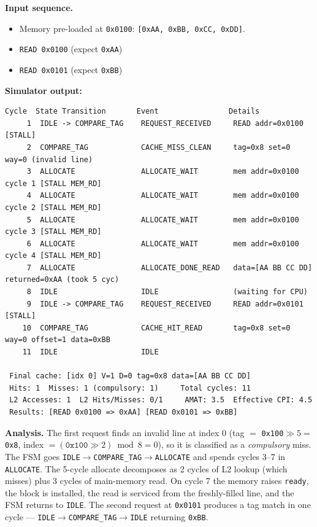 \documentclass[11pt,a4paper]{article}
\begin{document}
\textbf{Input sequence.}

\begin{itemize}[leftmargin=1.4em,itemsep=0.05em]
    \item Memory pre-loaded at \texttt{0x0100}: \texttt{[0xAA, 0xBB, 0xCC, 0xDD]}.
    \item \texttt{READ 0x0100} (expect \texttt{0xAA})
    \item \texttt{READ 0x0101} (expect \texttt{0xBB})
\end{itemize}

\textbf{Simulator output:}
\begin{lstlisting}[style=trace]
 Cycle  State Transition       Event                Details
     1  IDLE -> COMPARE_TAG    REQUEST_RECEIVED     READ addr=0x0100 [STALL]
     2  COMPARE_TAG            CACHE_MISS_CLEAN     tag=0x8 set=0 way=0 (invalid line)
     3  ALLOCATE               ALLOCATE_WAIT        mem addr=0x0100 cycle 1 [STALL MEM_RD]
     4  ALLOCATE               ALLOCATE_WAIT        mem addr=0x0100 cycle 2 [STALL MEM_RD]
     5  ALLOCATE               ALLOCATE_WAIT        mem addr=0x0100 cycle 3 [STALL MEM_RD]
     6  ALLOCATE               ALLOCATE_WAIT        mem addr=0x0100 cycle 4 [STALL MEM_RD]
     7  ALLOCATE               ALLOCATE_DONE_READ   data=[AA BB CC DD] returned=0xAA (took 5 cyc)
     8  IDLE                   IDLE                 (waiting for CPU)
     9  IDLE -> COMPARE_TAG    REQUEST_RECEIVED     READ addr=0x0101 [STALL]
    10  COMPARE_TAG            CACHE_HIT_READ       tag=0x8 set=0 way=0 offset=1 data=0xBB
    11  IDLE                   IDLE

 Final cache: [idx 0] V=1 D=0 tag=0x8 data=[AA BB CC DD]
 Hits: 1  Misses: 1 (compulsory: 1)     Total cycles: 11
 L2 Accesses: 1  L2 Hits/Misses: 0/1     AMAT: 3.5  Effective CPI: 4.5
 Results: [READ 0x0100 => 0xAA] [READ 0x0101 => 0xBB]
\end{lstlisting}

\textbf{Analysis.} The first request finds an invalid line at index 0
(tag $=$ \texttt{0x100}$\gg 5 =$ \texttt{0x8},
index $= (\texttt{0x100}\gg 2)\bmod 8 = 0$), so it is classified as a
\emph{compulsory} miss. The FSM goes
\texttt{IDLE}$\to$\texttt{COMPARE\_TAG}$\to$\texttt{ALLOCATE} and spends
cycles 3–7 in \texttt{ALLOCATE}. The 5-cycle allocate decomposes as 2 cycles
of L2 lookup (which misses) plus 3 cycles of main-memory read. On cycle 7 the
memory raises \texttt{ready}, the block is installed, the read is serviced
from the freshly-filled line, and the FSM returns to \texttt{IDLE}. The
second request at \texttt{0x0101} produces a tag match in one cycle —
\texttt{IDLE}$\to$\texttt{COMPARE\_TAG}$\to$\texttt{IDLE} returning \texttt{0xBB}.
\end{document}
